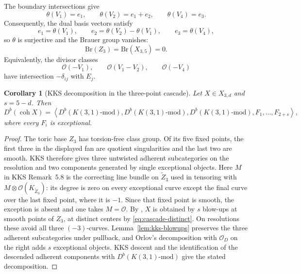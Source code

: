 \documentclass[11pt]{article}
\theoremstyle{plain}
\newtheorem{corollary}[corollary]{Corollary}
\theoremstyle{definition}
\theoremstyle{remark}
\newcommand{\Db}{D^b}
\newcommand{\coh}{\operatorname{coh}}
\newcommand{\Br}{\mathrm{Br}}
\newcommand{\OO}{\mathcal O}
\begin{document}
The boundary intersections give
\[
\theta(V_1)=e_1,\qquad
\theta(V_2)=e_1+e_2,\qquad
\theta(V_4)=e_3.
\]
Consequently, the dual basis vectors satisfy
\[
e_1=\theta(V_1),\qquad
e_2=\theta(V_2)-\theta(V_1),\qquad
e_3=\theta(V_4),
\]
so \(\theta\) is surjective and the Brauer group vanishes:
\[
\Br(Z_3)=\Br(X_{3,5})=0.
\]
Equivalently, the divisor classes
\[
\OO(-V_1),\qquad
\OO(V_1-V_2),\qquad
\OO(-V_4)
\]
have intersection \(-\delta_{ij}\) with \(E_j\).

\begin{corollary}[KKS decomposition in the three-point cascade]
\label{rem:three-point-toric-descent}
Let \(X\in X_{3,d}\) and \(s=5-d\). Then
\[
\Db(\coh X)=\left\langle
\Db(K(3,1)\text{-mod}),
\Db(K(3,1)\text{-mod}),
\Db(K(3,1)\text{-mod}),F_1,\ldots,F_{2+s}
\right\rangle,
\]
where every \(F_i\) is exceptional.
\end{corollary}

\begin{proof}
The toric base \(Z_3\) has torsion-free class group. Of its five
fixed points, the first three in the displayed fan are quotient
singularities and the last two are smooth. KKS
\cite[Proposition~5.6, Remark~5.8, and Corollary~5.10]{KKS2020}
therefore gives three untwisted adherent subcategories on the resolution
and two components generated by single exceptional objects. Here \(M\) in KKS Remark~5.8 is the
correcting line bundle on \(\widetilde Z_3\) used in tensoring with
\(M\otimes\OO(K_{\widetilde Z_3})\):
its degree is zero on every exceptional curve except the final curve
over the last fixed point, where it is \(-1\). Since that fixed point
is smooth, the exception is absent and one takes \(M=\OO\).
By \cite[Corollary~8(3)]{Corti2016}, \(X\) is obtained by
\(s\) blow-ups at smooth points of \(Z_3\), at distinct centers by
\eqref{eq:cascade-distinct}. On resolutions these avoid all three
\((-3)\)-curves. Lemma~\ref{lem:kks-blowups} preserves the three
adherent subcategories under pullback, and Orlov's decomposition with
\(\OO_D\) on the right adds \(s\) exceptional objects. KKS descent and
the identification of the descended adherent components with
\(\Db(K(3,1)\text{-mod})\)
\cite[Theorems~2.12(i) and~3.16]{KKS2020} give the stated decomposition.
\end{proof}
\end{document}
